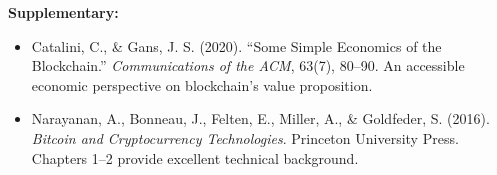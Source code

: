 \documentclass[11pt,a4paper]{article}
\begin{document}
\textbf{Supplementary:}
\begin{itemize}
    \item Catalini, C., \& Gans, J. S. (2020). ``Some Simple Economics of the Blockchain.'' \textit{Communications of the ACM}, 63(7), 80--90. An accessible economic perspective on blockchain's value proposition.
    \item Narayanan, A., Bonneau, J., Felten, E., Miller, A., \& Goldfeder, S. (2016). \textit{Bitcoin and Cryptocurrency Technologies}. Princeton University Press. Chapters 1--2 provide excellent technical background.
\end{itemize}

\end{document}
